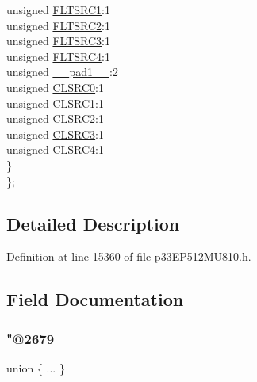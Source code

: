 \begin{DoxyCompactItemize}
\begin{tabbing}
\>\>unsigned \hyperlink{structtag_f_c_l_c_o_n6_b_i_t_s_a7e2dde44582a2b4411afb97f93704738}{FLTSRC1}:1\\
\>\>unsigned \hyperlink{structtag_f_c_l_c_o_n6_b_i_t_s_a41a56979130beaf62e52443409af0daf}{FLTSRC2}:1\\
\>\>unsigned \hyperlink{structtag_f_c_l_c_o_n6_b_i_t_s_a919f99b1241a5f4d92f40778ec6b91a8}{FLTSRC3}:1\\
\>\>unsigned \hyperlink{structtag_f_c_l_c_o_n6_b_i_t_s_afedaf58b1e4d19481bb47b44b59ecbc3}{FLTSRC4}:1\\
\>\>unsigned \hyperlink{structtag_f_c_l_c_o_n6_b_i_t_s_acaf2d0924a107ec6e8d2e31febaf66f9}{\_\_pad1\_\_}:2\\
\>\>unsigned \hyperlink{structtag_f_c_l_c_o_n6_b_i_t_s_a0a945873cb44d41b241b83b08b599880}{CLSRC0}:1\\
\>\>unsigned \hyperlink{structtag_f_c_l_c_o_n6_b_i_t_s_a59f38630bf59c0035792456d75d03410}{CLSRC1}:1\\
\>\>unsigned \hyperlink{structtag_f_c_l_c_o_n6_b_i_t_s_a24cd8f779980ba4b721ab1d0d63648de}{CLSRC2}:1\\
\>\>unsigned \hyperlink{structtag_f_c_l_c_o_n6_b_i_t_s_a86b531e28879dfb3db317ce2147d381e}{CLSRC3}:1\\
\>\>unsigned \hyperlink{structtag_f_c_l_c_o_n6_b_i_t_s_a438bb199cbcc62bfd380ead48036accc}{CLSRC4}:1\\
\>\} \\
\}; \\

\end{tabbing}\end{DoxyCompactItemize}


\subsection{Detailed Description}


Definition at line 15360 of file p33\+E\+P512\+M\+U810.\+h.



\subsection{Field Documentation}
\mbox{\label{structtag_f_c_l_c_o_n6_b_i_t_s_a6eaacb4b89eaa63d89569d0d41341b9f}} 
\subsubsection{\texorpdfstring{"@2679}{@2679}}
{\footnotesize\ttfamily union \{ ... \} }

